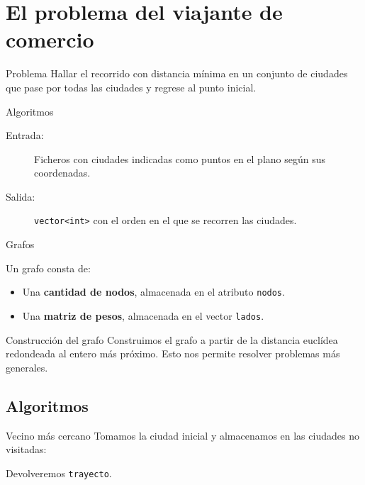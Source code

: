 \section{El problema del viajante de comercio}

\begin{frame}{Problema}
Hallar el recorrido con distancia mínima en un conjunto de
ciudades que pase por todas las ciudades y regrese al punto inicial.
\end{frame}

\begin{frame}{Algoritmos}
\begin{description}
 \item[Entrada:] Ficheros con ciudades indicadas como puntos en el plano según sus
 coordenadas.
 \item[Salida:] \texttt{vector<int>} con el orden en el que se recorren las ciudades.
\end{description}
\end{frame}

\begin{frame}{Grafos}

Un grafo consta de:

\begin{itemize}
  \item Una \textbf{cantidad de nodos}, almacenada en el atributo \texttt{nodos}.
  \item Una \textbf{matriz de pesos}, almacenada en el vector \texttt{lados}.
\end{itemize}

\end{frame}

\begin{frame}[fragile]{Construcción del grafo}
Construimos el grafo a partir de la distancia euclídea redondeada al entero más próximo.
Esto nos permite resolver problemas más generales.

\end{frame}

\subsection{Algoritmos}

\begin{frame}[fragile]{Vecino más cercano}
Tomamos la ciudad inicial y almacenamos en las ciudades no visitadas:

Devolveremos \texttt{trayecto}.
\end{frame}

